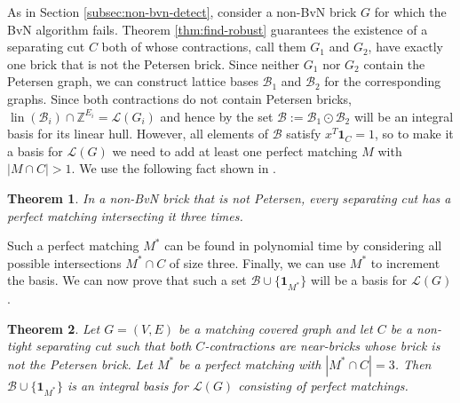 \documentclass[11pt]{article}
\DeclareMathOperator{\lin}{lin}
\newcommand{\1}{\mathbf{1}}
\newcommand{\0}{\mathbf{0}}
\newcommand{\zB}{\mathcal B}
\newcommand{\zL}{\mathcal L}
\newcommand{\Z}{\mathbb{Z}}
\newtheorem{theorem}{Theorem}[section]
\begin{document}
As in Section \ref{subsec:non-bvn-detect}, consider a non-BvN brick $G$ for which the BvN algorithm fails. Theorem \ref{thm:find-robust} guarantees the existence of a separating cut $C$ both of whose contractions, call them $G_1$ and $G_2$, have exactly one brick that is not the Petersen brick.
Since neither $G_1$ nor $G_2$ contain the Petersen graph, we can construct lattice bases $\zB_1$ and $\zB_2$ for the corresponding graphs. Since both contractions do not contain Petersen bricks, $\lin(\zB_i)\cap \Z^{E_i} = \zL(G_i)$ and hence by  the set $\zB:=\zB_1 \odot \zB_2$ will be an integral basis for its linear hull. However, all elements of $\zB$ satisfy $x^T \mathbf{1}_C=1$, so to make it a basis for $\zL(G)$ we need to add at least one perfect matching $M$ with $|M\cap C|>1$.
We use the following fact shown in \cite{camposlucchesi}.
\begin{theorem}\label{thm:char-three}
    In a non-BvN brick that is not Petersen, every separating cut has a perfect matching intersecting it three times.
\end{theorem}
Such a perfect matching $M^*$ can be found in polynomial time by considering all possible intersections $M^*\cap C$ of size three. Finally, we can use $M^*$ to increment the basis. We can now prove that such a set $\zB \cup \{\mathbf{1}_{M^*}\}$ will be a basis for $\zL(G)$.
\begin{theorem}
    Let $G=(V,E)$ be a matching covered graph and let $C$ be a non-tight separating cut such that both $C$-contractions are near-bricks whose brick is not the Petersen brick. Let $M^*$ be a perfect matching with $|M^*\cap C|=3$. Then $\zB \cup \{\mathbf{1}_{M^*}\}$ is an integral basis for $\zL(G)$ consisting of perfect matchings. 
\end{theorem}
\end{document}

